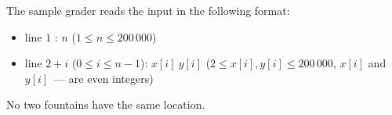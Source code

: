 The sample grader reads the input in the following format:
\begin{itemize}
\item line $1$ : $n$ ($1 \leq n \leq 200\,000$)
\item line $2+i$ ($0 \leq i \leq n - 1$): $x[i]\ y[i]$ ($2 \leq x[i], y[i] \leq 200\,000$, $x[i]$ and $y[i]$~--- are even integers)
\end{itemize}

No two fountains have the same location.
